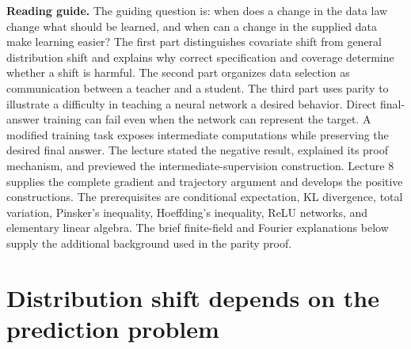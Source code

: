 \documentclass[11pt,twoside]{article}
\theoremstyle{definition}
\theoremstyle{remark}
\begin{document}
\begin{center}
\end{center}

\noindent\textbf{Reading guide.}
The guiding question is: when does a change in the data law change what should
be learned, and when can a change in the supplied data make learning easier?
The first part distinguishes covariate shift from general distribution shift
and explains why correct specification and coverage determine whether a shift
is harmful. The second part organizes data selection as communication between
a teacher and a student. The third part uses parity to illustrate a difficulty
in teaching a neural network a desired behavior. Direct final-answer training
can fail even when the network can represent the target. A modified training
task exposes intermediate computations while preserving the desired final
answer. The lecture stated the negative result, explained its proof mechanism,
and previewed the intermediate-supervision construction. Lecture 8 supplies
the complete gradient and trajectory argument and develops the positive
constructions.
The prerequisites are conditional expectation, KL divergence, total
variation, Pinsker's inequality, Hoeffding's inequality, ReLU networks, and
elementary linear algebra. The brief finite-field and Fourier explanations
below supply the additional background used in the parity proof.

\section{Distribution shift depends on the prediction problem}
\label{sec:shift}
\end{document}
